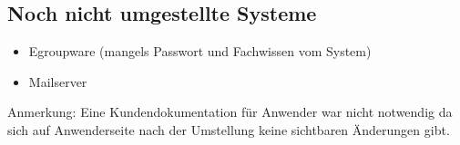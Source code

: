 \subsection{Noch nicht umgestellte Systeme}
\begin{itemize}
\item Egroupware (mangels Passwort und Fachwissen vom System)
\item Mailserver
\end{itemize}

\noindent Anmerkung: Eine Kundendokumentation für Anwender war nicht notwendig da sich auf Anwenderseite nach der Umstellung keine sichtbaren Änderungen gibt.



